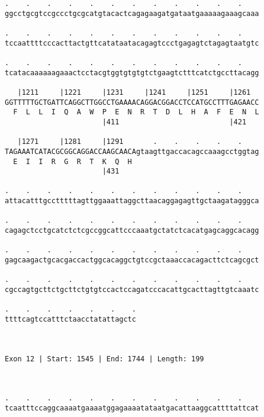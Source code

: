 \documentclass{article}
\begin{document}
\begin{Verbatim}
.    .    .    .    .    .    .    .    .    .    .    .    
ggcctgcgtccgccctgcgcatgtacactcagagaagatgataatgaaaaagaaagcaaa
                                                            
.    .    .    .    .    .    .    .    .    .    .    .    
tccaattttcccacttactgttcatataatacagagtccctgagagtctagagtaatgtc
                                                            
.    .    .    .    .    .    .    .    .    .    .    .    
tcatacaaaaaagaaactcctacgtggtgtgtgtctgaagtctttcatctgccttacagg
                                                            
   |1211     |1221     |1231     |1241     |1251     |1261  
GGTTTTTGCTGATTCAGGCTTGGCCTGAAAACAGGACGGACCTCCATGCCTTTGAGAACC
  F  L  L  I  Q  A  W  P  E  N  R  T  D  L  H  A  F  E  N  L
                       |411                          |421   
  
   |1271     |1281     |1291       .    .    .    .    .    
TAGAAATCATACGCGGCAGGACCAAGCAACAgtaagttgaccacagccaaagcctggtag
  E  I  I  R  G  R  T  K  Q  H                              
                       |431                                 
  
.    .    .    .    .    .    .    .    .    .    .    .    
attacatttgcctttttagttggaaattaggcttaacaggagagttgctaagatagggca
                                                            
.    .    .    .    .    .    .    .    .    .    .    .    
cagagctcctgcatctctcgccggcattcccaaatgctatctcacatgagcaggcacagg
                                                            
.    .    .    .    .    .    .    .    .    .    .    .    
gagcaagactgcacgaccactggcacaggctgtccgctaaaccacagacttctcagcgct
                                                            
.    .    .    .    .    .    .    .    .    .    .    .    
cgccagtgcttctgcttctgtgtccactccagatcccacattgcacttagttgtcaaatc
                                                            
.    .    .    .    .    .    .
ttttcagtccatttctaacctatattagctc
                               
                               
 
Exon 12 | Start: 1545 | End: 1744 | Length: 199



.    .    .    .    .    .    .    .    .    .    .    .    
tcaatttccaggcaaaatgaaaatggagaaaatataatgacattaaggcattttattcat
                                                            

\end{Verbatim}
\end{document}
